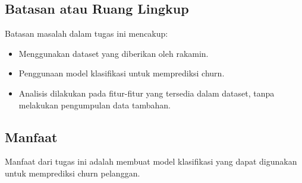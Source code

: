 \subsection{Batasan atau Ruang Lingkup}
Batasan masalah dalam tugas ini mencakup:
\begin{itemize}
    \item Menggunakan dataset yang diberikan oleh rakamin.
    \item Penggunaan model klasifikasi untuk memprediksi churn.
    \item Analisis dilakukan pada fitur-fitur yang tersedia dalam dataset, tanpa melakukan pengumpulan data tambahan.
\end{itemize}

\subsection{Manfaat}
Manfaat dari tugas ini adalah membuat model klasifikasi yang dapat digunakan untuk memprediksi churn pelanggan.
